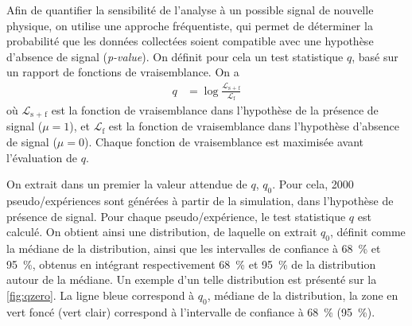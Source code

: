 \bigskip

Afin de quantifier la sensibilité de l'analyse à un possible signal de nouvelle physique, on utilise une approche fréquentiste, qui permet de déterminer la probabilité que les données collectées soient compatible avec une hypothèse d'absence de signal (\emph{p-value}). On définit pour cela un test statistique $q$, basé sur un rapport de fonctions de vraisemblance. On a
\begin{align*}
  q &= \log{ \frac{\mathcal{L}_\text{s + f}}{\mathcal{L}_\text{f}} }
\end{align*}
où $\mathcal{L}_\text{s + f}$ est la fonction de vraisemblance dans l'hypothèse de la présence de signal ($\mu = 1$), et $\mathcal{L}_\text{f}$ est la fonction de vraisemblance dans l'hypothèse d'absence de signal ($\mu = 0$). Chaque fonction de vraisemblance est maximisée avant l'évaluation de $q$.

\medskip

On extrait dans un premier la valeur attendue de $q$, $q_0$. Pour cela, \num{2000} pseudo\-/expériences sont générées à partir de la simulation, dans l'hypothèse de présence de signal. Pour chaque pseudo\-/expérience, le test statistique $q$ est calculé. On obtient ainsi une distribution, de laquelle on extrait $q_0$, définit comme la médiane de la distribution, ainsi que les intervalles de confiance à \SI{68}{\percent} et \SI{95}{\percent}, obtenus en intégrant respectivement \SI{68}{\percent} et \SI{95}{\percent} de la distribution autour de la médiane. Un exemple d'un telle distribution est présenté sur la \cref{fig:qzero}. La ligne bleue correspond à $q_0$, médiane de la distribution, la zone en vert foncé (vert clair) correspond à l'intervalle de confiance à \SI{68}{\percent} (\SI{95}{\percent}).

